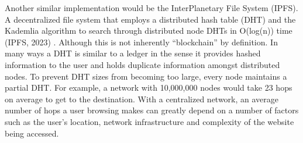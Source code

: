 \documentclass{article}
\begin{document}
\begin{CJK}{UTF8}{gbsn}
\noindent{}

Another similar implementation would be the InterPlanetary File System (IPFS). A decentralized file system that employs a distributed hash table (DHT) and the Kademlia algorithm to search through distributed node DHTs in O(log(n)) time (IPFS, 2023) . Although this is not inherently “blockchain” by definition. In many ways a DHT is similar to a ledger in the sense it provides hashed information to the user and holds duplicate information amongst distributed nodes. To prevent DHT sizes from becoming too large, every node maintains a partial DHT. For example, a network with 10,000,000 nodes would take 23 hops on average to get to the destination. With a centralized network, an average number of hops a user browsing makes can greatly depend on a number of factors such as the user’s location, network infrastructure and complexity of the website being accessed.

\noindent{}


\end{CJK}
\end{document}
